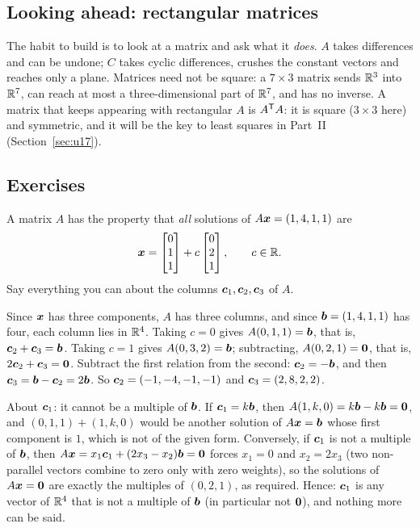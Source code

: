 \subsection{Looking ahead: rectangular matrices}

The habit to build is to look at a matrix and ask what it \emph{does}. $A$ takes differences
and can be undone; $C$ takes cyclic differences, crushes the constant vectors and reaches
only a plane. Matrices need not be square: a $7\times3$ matrix sends $\mathbb{R}^3$ into $\mathbb{R}^7$, can
reach at most a three-dimensional part of $\mathbb{R}^7$, and has no inverse. A matrix that keeps
appearing with rectangular $A$ is $A^{\mathsf{T}} A$: it is square ($3\times3$ here) and symmetric, and
it will be the key to least squares in Part~II (Section~\ref{sec:u17}).

\subsection{Exercises}

\begin{exercise}\label{ex:u02-quiz}
A matrix $A$ has the property that \emph{all} solutions of $A\boldsymbol{x}=(1,4,1,1)$ are
\[
  \boldsymbol{x}=\begin{bmatrix} 0\\ 1\\ 1\end{bmatrix} + c\begin{bmatrix} 0\\ 2\\ 1\end{bmatrix},
  \qquad c\in\mathbb{R} .
\]
Say everything you can about the columns $\boldsymbol{c}_1,\boldsymbol{c}_2,\boldsymbol{c}_3$ of $A$.
\end{exercise}
\begin{solution}
Since $\boldsymbol{x}$ has three components, $A$ has three columns, and since $\boldsymbol{b}=(1,4,1,1)$ has
four, each column lies in $\mathbb{R}^4$. Taking $c=0$ gives $A(0,1,1)=\boldsymbol{b}$, that is,
$\boldsymbol{c}_2+\boldsymbol{c}_3=\boldsymbol{b}$. Taking $c=1$ gives $A(0,3,2)=\boldsymbol{b}$; subtracting,
$A(0,2,1)=\boldsymbol{0}$, that is, $2\boldsymbol{c}_2+\boldsymbol{c}_3=\boldsymbol{0}$. Subtract the first relation from the
second: $\boldsymbol{c}_2=-\boldsymbol{b}$, and then $\boldsymbol{c}_3=\boldsymbol{b}-\boldsymbol{c}_2=2\boldsymbol{b}$. So
$\boldsymbol{c}_2=(-1,-4,-1,-1)$ and $\boldsymbol{c}_3=(2,8,2,2)$.

About $\boldsymbol{c}_1$: it cannot be a multiple of $\boldsymbol{b}$. If $\boldsymbol{c}_1=k\boldsymbol{b}$, then
$A(1,k,0)=k\boldsymbol{b}-k\boldsymbol{b}=\boldsymbol{0}$, and $(0,1,1)+(1,k,0)$ would be another solution of
$A\boldsymbol{x}=\boldsymbol{b}$ whose first component is $1$, which is not of the given form. Conversely,
if $\boldsymbol{c}_1$ is not a multiple of $\boldsymbol{b}$, then $A\boldsymbol{x}=x_1\boldsymbol{c}_1+(2x_3-x_2)\boldsymbol{b}=\boldsymbol{0}$
forces $x_1=0$ and $x_2=2x_3$ (two non-parallel vectors combine to zero only with zero
weights), so the solutions of $A\boldsymbol{x}=\boldsymbol{0}$ are exactly the multiples of $(0,2,1)$, as
required. Hence: $\boldsymbol{c}_1$ is any vector of $\mathbb{R}^4$ that is not a multiple of $\boldsymbol{b}$
(in particular not $\boldsymbol{0}$), and nothing more can be said.
\end{solution}

